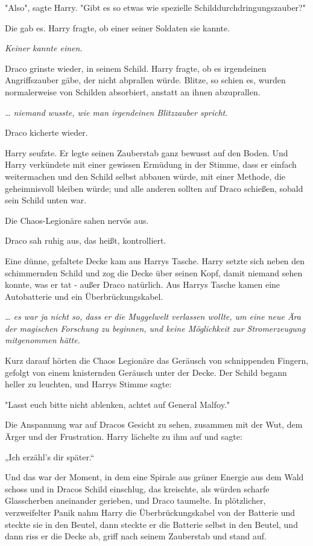{"Also", sagte Harry. "Gibt es so etwas wie spezielle Schilddurchdringungszauber?"

Die gab es. Harry fragte, ob einer seiner Soldaten sie kannte.

\emph{Keiner kannte einen.}

Draco grinste wieder, in seinem Schild. Harry fragte, ob es irgendeinen Angriffszauber gäbe, der nicht abprallen würde. Blitze, so schien es, wurden normalerweise von Schilden absorbiert, anstatt an ihnen abzuprallen.

\emph{… niemand wusste, wie man irgendeinen Blitzzauber spricht}.

Draco kicherte wieder.

Harry seufzte. Er legte seinen Zauberstab ganz bewusst auf den Boden. Und Harry verkündete mit einer gewissen Ermüdung in der Stimme, dass er einfach weitermachen und den Schild selbst abbauen würde, mit einer Methode, die geheimnisvoll bleiben würde; und alle anderen sollten auf Draco schießen, sobald sein Schild unten war.

Die Chaos-Legionäre sahen nervös aus.

Draco sah ruhig aus, das heißt, kontrolliert.

Eine dünne, gefaltete Decke kam aus Harrys Tasche. Harry setzte sich neben den schimmernden Schild und zog die Decke über seinen Kopf, damit niemand sehen konnte, was er tat - außer Draco natürlich. Aus Harrys Tasche kamen eine Autobatterie und ein Überbrückungskabel.

\emph{… es war ja nicht so, dass er die Muggelwelt verlassen wollte, um eine neue Ära der magischen Forschung zu beginnen, und keine Möglichkeit zur Stromerzeugung mitgenommen hätte.}

Kurz darauf hörten die Chaos Legionäre das Geräusch von schnippenden Fingern, gefolgt von einem knisternden Geräusch unter der Decke. Der Schild begann heller zu leuchten, und Harrys Stimme sagte:

"Lasst euch bitte nicht ablenken, achtet auf General Malfoy."

Die Anspannung war auf Dracos Gesicht zu sehen, zusammen mit der Wut, dem Ärger und der Frustration. Harry lächelte zu ihm auf und sagte:

„Ich erzähl's dir später.“

Und das war der Moment, in dem eine Spirale aus grüner Energie aus dem Wald schoss und in Dracos Schild einschlug, das kreischte, als würden scharfe Glasscherben aneinander gerieben, und Draco taumelte. In plötzlicher, verzweifelter Panik nahm Harry die Überbrückungskabel von der Batterie und steckte sie in den Beutel, dann steckte er die Batterie selbst in den Beutel, und dann riss er die Decke ab, griff nach seinem Zauberstab und stand auf.

}
